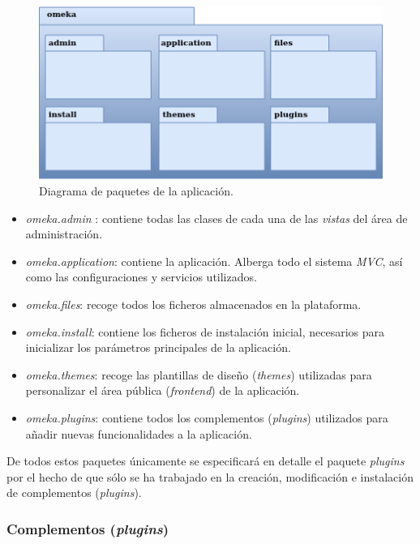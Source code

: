 \documentclass[
]{article}
\providecommand{\tightlist}{%
  \setlength{\itemsep}{0pt}\setlength{\parskip}{0pt}}
\begin{document}
\begin{figure}
\hypertarget{da-pck-1}{%
\centering
\includegraphics{../_static/images/pck-1.png}
\caption{Diagrama de paquetes de la aplicación.}\label{da-pck-1}
}
\end{figure}

\begin{itemize}
\tightlist
\item
  \emph{omeka.admin} : contiene todas las clases de cada una de las
  \emph{vistas} del área de administración.
\item
  \emph{omeka.application}: contiene la aplicación. Alberga todo el
  sistema \emph{MVC}, así como las configuraciones y servicios
  utilizados.
\item
  \emph{omeka.files}: recoge todos los ficheros almacenados en la
  plataforma.
\item
  \emph{omeka.install}: contiene los ficheros de instalación inicial,
  necesarios para inicializar los parámetros principales de la
  aplicación.
\item
  \emph{omeka.themes}: recoge las plantillas de diseño (\emph{themes})
  utilizadas para personalizar el área pública (\emph{frontend}) de la
  aplicación.
\item
  \emph{omeka.plugins}: contiene todos los complementos (\emph{plugins})
  utilizados para añadir nuevas funcionalidades a la aplicación.
\end{itemize}

De todos estos paquetes únicamente se especificará en detalle el paquete
\emph{plugins} por el hecho de que sólo se ha trabajado en la creación,
modificación e instalación de complementos (\emph{plugins}).

\hypertarget{complementos-plugins}{%
\subsubsection{\texorpdfstring{Complementos
(\emph{plugins})}{Complementos (plugins)}}\label{complementos-plugins}}
\end{document}
